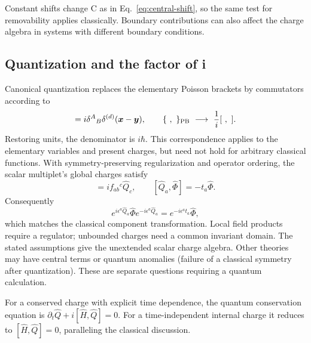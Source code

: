 \documentclass[11pt]{article}
\begin{document}
Constant shifts change C as in Eq.~\eqref{eq:central-shift}, so the same
test for removability applies classically. Boundary contributions can
also affect the charge algebra in systems with different boundary
conditions.

\subsection{Quantization and the factor of i}
Canonical quantization replaces the elementary Poisson brackets by
commutators according to
\begin{equation}
 [\widehat\Phi^A(\bm x),\widehat\Pi_B(\bm y)]
 =i\delta^A{}_B\delta^{(d)}(\bm x-\bm y),
 \qquad \{\ ,\ \}_{\rm PB}\ \longrightarrow\ \frac1i[\ ,\ ].
 \label{eq:quantization}
\end{equation}
Restoring units, the denominator is \(i\hbar\). This correspondence
applies to the elementary variables and present charges, but need not
hold for arbitrary classical functions. With symmetry-preserving
regularization and operator ordering, the
scalar multiplet's global charges satisfy
\begin{equation}
 [\widehat Q_a,\widehat Q_b]=if_{ab}{}^c\widehat Q_c,
 \qquad [\widehat Q_a,\widehat\Phi]=-t_a\widehat\Phi.
 \label{eq:quantum-charge-algebra}
\end{equation}
Consequently
\[
 e^{i\epsilon^a\widehat Q_a}\widehat\Phi
 e^{-i\epsilon^a\widehat Q_a}
 =e^{-i\epsilon^at_a}\widehat\Phi,
\]
which matches the classical component transformation. Local field
products require a regulator; unbounded charges need a common invariant
domain. The stated assumptions give the unextended scalar charge
algebra. Other theories may have central terms or quantum anomalies
(failure of a classical symmetry after quantization). These are separate
questions requiring a quantum calculation.

For a conserved charge with explicit time dependence, the quantum
conservation equation is
\(\partial_t\widehat Q+i[\widehat H,\widehat Q]=0\).
For a time-independent internal charge it reduces to
\([\widehat H,\widehat Q]=0\), paralleling the classical discussion.



\clearpage
\end{document}
